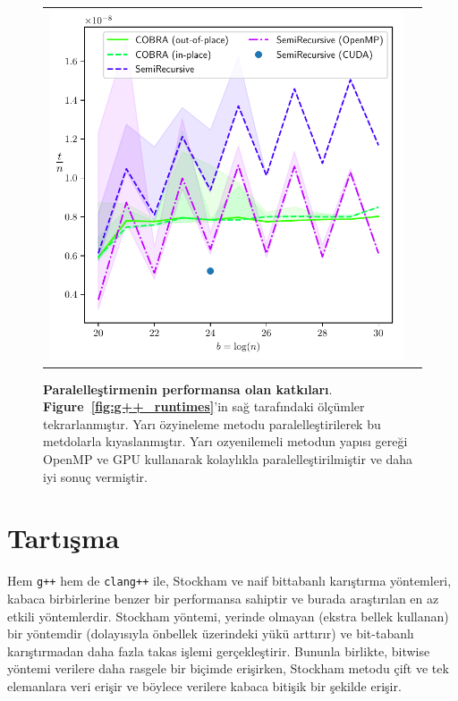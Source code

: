 \documentclass[10pt]{article}
\begin{document}
\begin{figure}[ht!]
\centering
\begin{tabular}{cc}
  \includegraphics[width=6in]{results/open_mp_performance.pdf}
\end{tabular}
\caption{{\bf Paralelle\c{s}tirmenin performansa olan katk{\i}lar{\i}}.
{\bf Figure~\ref{fig:g++_runtimes}}'in sa\u{g} taraf{\i}ndaki \"{o}l\c{c}\"{u}mler tekrarlanm{\i}\c{s}t{\i}r.
Yar{\i} \"{o}zyineleme metodu paralelle\c{s}tirilerek bu metdolarla k{\i}yaslanm{\i}\c{s}t{\i}r.
Yar{\i} ozyenilemeli metodun yap{\i}s{\i} gere\u{g}i OpenMP ve GPU kullanarak kolayl{\i}kla
paralelle\c{s}tirilmi\c{s}tir ve daha iyi sonu\c{c} vermi\c{s}tir.
  \label{fig:g++_parallel_runtimes}
}
\end{figure}

\section*{Tart{\i}\c{s}ma}

Hem {\tt g++} hem de {\tt clang++} ile, Stockham ve naif bittabanl{\i} 
kar{\i}\c{s}t{\i}rma y\"{o}ntemleri, kabaca birbirlerine benzer bir performansa sahiptir 
ve burada ara\c{s}t{\i}r{\i}lan en az etkili y\"{o}ntemlerdir. Stockham y\"{o}ntemi, yerinde 
olmayan (ekstra bellek kullanan) bir y\"{o}ntemdir (dolay{\i}s{\i}yla \"{o}nbellek 
\"{u}zerindeki y\"{u}k\"{u} artt{\i}r{\i}r) ve bit-tabanl{\i} kar{\i}\c{s}t{\i}rmadan daha fazla 
takas i\c{s}lemi ger\c{c}ekle\c{s}tirir. Bununla birlikte, bitwise y\"{o}ntemi 
verilere daha rasgele bir bi\c{c}imde eri\c{s}irken, Stockham metodu 
\c{c}ift ve tek elemanlara veri eri\c{s}ir ve b\"{o}ylece verilere kabaca 
biti\c{s}ik bir \c{s}ekilde eri\c{s}ir.
\end{document}
